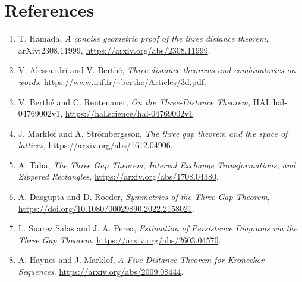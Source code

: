 \documentclass[11pt]{article}
\begin{document}
\section{References}
\begin{enumerate}
\item T. Hamada, \emph{A concise geometric proof of the three distance theorem},
arXiv:2308.11999, \url{https://arxiv.org/abs/2308.11999}.
\item V. Alessandri and V. Berthé, \emph{Three distance theorems and
combinatorics on words}, \url{https://www.irif.fr/~berthe/Articles/3d.pdf}.
\item V. Berthé and C. Reutenauer, \emph{On the Three-Distance Theorem},
HAL:hal-04769002v1, \url{https://hal.science/hal-04769002v1}.
\item J. Marklof and A. Strömbergsson, \emph{The three gap theorem and the
space of lattices}, \url{https://arxiv.org/abs/1612.04906}.
\item A. Taha, \emph{The Three Gap Theorem, Interval Exchange Transformations,
and Zippered Rectangles}, \url{https://arxiv.org/abs/1708.04380}.
\item A. Dasgupta and D. Roeder, \emph{Symmetries of the Three-Gap Theorem},
\url{https://doi.org/10.1080/00029890.2022.2158021}.
\item L. Suarez Salas and J. A. Perea, \emph{Estimation of Persistence
Diagrams via the Three Gap Theorem}, \url{https://arxiv.org/abs/2603.04570}.
\item A. Haynes and J. Marklof, \emph{A Five Distance Theorem for Kronecker
Sequences}, \url{https://arxiv.org/abs/2009.08444}.
\end{enumerate}
\end{document}
